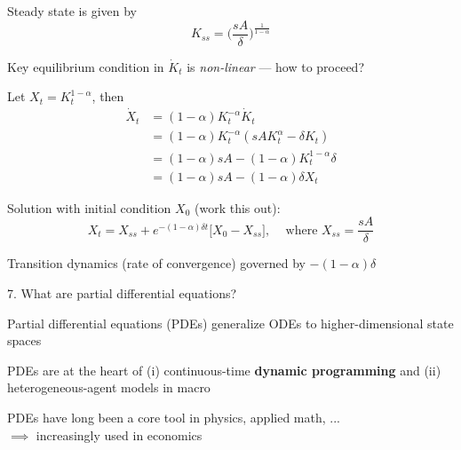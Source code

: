 \documentclass[11pt, aspectratio=169]{beamer}
\newenvironment{witemize}{\itemize\addtolength{\itemsep}{10pt}}{\enditemize}
\begin{document}
\begin{frame}{}
	
{\small
\begin{witemize}
\item Steady state is given by
\begin{equation*}
	K_{ss} = \bigg( \frac{sA}{\delta} \bigg)^\frac{1}{1-\alpha}
\end{equation*}

\item Key equilibrium condition in $\dot K_t$ is \textit{non-linear} --- how to proceed?

\item Let $X_t = K_t^{1-\alpha}$, then 
\begin{align*}
	\dot X_t &= (1-\alpha) K_t^{-\alpha} \dot K_t  \\
	&= (1-\alpha) K_t^{-\alpha} ( s A K_t^\alpha - \delta K_t )  \\
	&= (1-\alpha) s A - (1-\alpha) K_t^{1-\alpha} \delta \\
	&= (1-\alpha) s A - (1-\alpha) \delta X_t
\end{align*}

\item Solution with initial condition $X_0$ (work this out):
\begin{equation*}
	X_t = X_{ss} + e^{-(1-\alpha) \delta t} \bigg[ X_0 - X_{ss} \bigg], \;\;\; \text{ where } X_{ss} = \frac{sA}{\delta}
\end{equation*}

\item Transition dynamics (rate of convergence) governed by $-(1-\alpha) \delta$

\end{witemize}
}
\end{frame}



\begin{frame}{7. What are partial differential equations?}
\begin{witemize}
\item Partial differential equations (PDEs) generalize ODEs to higher-dimensional state spaces

\item PDEs are at the heart of (i) continuous-time \textbf{dynamic programming} and (ii) heterogeneous-agent models in macro

\item PDEs have long been a core tool in physics, applied math, ... \\
$\implies$ increasingly used in economics

\end{witemize}
\end{frame}
\end{document}
